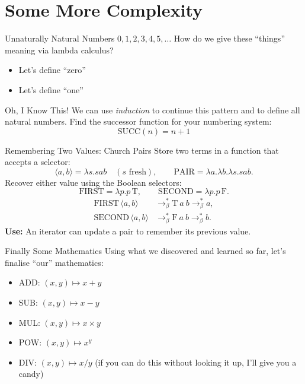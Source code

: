 \documentclass{beamer}
\begin{document}
\section{Some More Complexity}
\begin{frame}{Unnaturally Natural Numbers}
  $0,1,2,3,4,5,\dots$ How do we give these ``things'' meaning via lambda calculus?
  \begin{itemize}
    \item Let's define ``zero''
    \item Let's define ``one''
  \end{itemize}
\end{frame}
\begin{frame}{Oh, I Know This!}
  We can use \emph{induction} to continue this pattern and to define all natural numbers. Find the successor function for your numbering system:
  \[\mathrm{SUCC}(n)=n+1\]
\end{frame}
\begin{frame}{Remembering Two Values: Church Pairs}
  Store two terms in a function that accepts a selector:
  \[\langle a,b\rangle=\lambda s.sab\quad(s\text{ fresh}),\qquad
    \mathrm{PAIR}=\lambda a.\lambda b.\lambda s.sab.\]
  Recover either value using the Boolean selectors:
  \[\mathrm{FIRST}=\lambda p.p\,\mathrm{T},\qquad
    \mathrm{SECOND}=\lambda p.p\,\mathrm{F}.\]
  \begin{align*}
    \mathrm{FIRST}\,\langle a,b\rangle
      &\to_\beta^*\mathrm{T}\ a\ b\to_\beta^*a,\\
    \mathrm{SECOND}\,\langle a,b\rangle
      &\to_\beta^*\mathrm{F}\ a\ b\to_\beta^*b.
  \end{align*}
  \textbf{Use:} An iterator can update a pair to remember its previous value.
\end{frame}
\begin{frame}{Finally Some Mathematics}
  Using what we discovered and learned so far, let's finalise ``our'' mathematics:
  \begin{itemize}
    \item ADD: $(x,y)\mapsto x+y$
    \item SUB: $(x,y)\mapsto x-y$
    \item MUL: $(x,y)\mapsto x\times y$
    \item POW: $(x,y)\mapsto x^y$
    \item DIV: $(x,y)\mapsto x/y$ (if you can do this without looking it up, I'll give you a candy)
  \end{itemize}
\end{frame}
\end{document}
